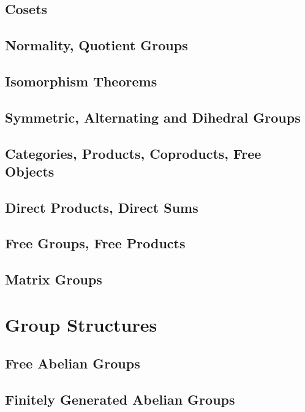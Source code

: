 \documentclass[a4paper,8pt]{article}
\theoremstyle{theorem}
\begin{document}
\subsection{Cosets}

\subsection{Normality, Quotient Groups}

\subsection{Isomorphism Theorems}

\subsection{Symmetric, Alternating and Dihedral Groups}

\subsection{Categories, Products, Coproducts, Free Objects}

\subsection{Direct Products, Direct Sums}

\subsection{Free Groups, Free Products}

\subsection{Matrix Groups}


\newpage

\section{Group Structures}

\subsection{Free Abelian Groups}

\subsection{Finitely Generated Abelian Groups}
\end{document}
